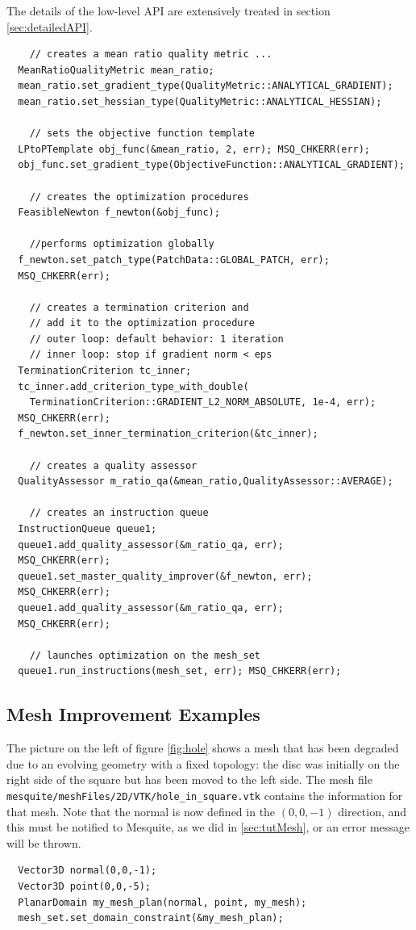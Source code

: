 \documentclass[letter]{report}
\begin{document}
The details of the low-level API are extensively treated in 
section \ref{sec:detailedAPI}.
\begin{verbatim}
    // creates a mean ratio quality metric ...
  MeanRatioQualityMetric mean_ratio;
  mean_ratio.set_gradient_type(QualityMetric::ANALYTICAL_GRADIENT);
  mean_ratio.set_hessian_type(QualityMetric::ANALYTICAL_HESSIAN);

    // sets the objective function template
  LPtoPTemplate obj_func(&mean_ratio, 2, err); MSQ_CHKERR(err);
  obj_func.set_gradient_type(ObjectiveFunction::ANALYTICAL_GRADIENT);
  
    // creates the optimization procedures
  FeasibleNewton f_newton(&obj_func);

    //performs optimization globally
  f_newton.set_patch_type(PatchData::GLOBAL_PATCH, err); 
  MSQ_CHKERR(err);

    // creates a termination criterion and 
    // add it to the optimization procedure
    // outer loop: default behavior: 1 iteration
    // inner loop: stop if gradient norm < eps
  TerminationCriterion tc_inner;
  tc_inner.add_criterion_type_with_double(
    TerminationCriterion::GRADIENT_L2_NORM_ABSOLUTE, 1e-4, err); 
  MSQ_CHKERR(err);
  f_newton.set_inner_termination_criterion(&tc_inner);

    // creates a quality assessor
  QualityAssessor m_ratio_qa(&mean_ratio,QualityAssessor::AVERAGE);

    // creates an instruction queue
  InstructionQueue queue1;
  queue1.add_quality_assessor(&m_ratio_qa, err); 
  MSQ_CHKERR(err);
  queue1.set_master_quality_improver(&f_newton, err); 
  MSQ_CHKERR(err);
  queue1.add_quality_assessor(&m_ratio_qa, err); 
  MSQ_CHKERR(err);

    // launches optimization on the mesh_set
  queue1.run_instructions(mesh_set, err); MSQ_CHKERR(err);
\end{verbatim} 

\subsection{Mesh Improvement Examples}

The picture on the left of figure \ref{fig:hole} shows a mesh that has been 
degraded due to an evolving geometry with a fixed topology:
the disc was initially on the right side of the square but has been moved to the left side. 
The mesh file \texttt{mesquite/meshFiles/2D/VTK/hole\_in\_square.vtk} contains the information for
that mesh. Note that the normal is now defined in the $(0,0,-1)$ direction, and this must be
notified to Mesquite, as we did in \ref{sec:tutMesh}, or an error message will be thrown. 
\begin{verbatim}
  Vector3D normal(0,0,-1);
  Vector3D point(0,0,-5);
  PlanarDomain my_mesh_plan(normal, point, my_mesh);
  mesh_set.set_domain_constraint(&my_mesh_plan);
\end{verbatim}
\end{document}
